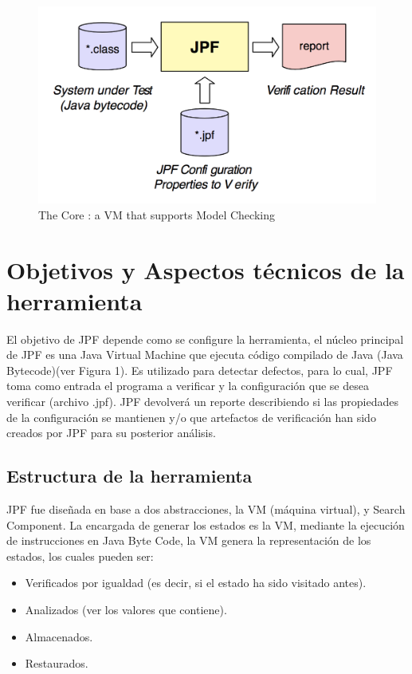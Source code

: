 \documentclass[runningheads]{llncs}
\begin{document}
\begin{figure}
\includegraphics[width=\textwidth]{fig1.png}
\caption{The Core : a VM that supports Model Checking} \label{fig1}
\end{figure}

\section{Objetivos y Aspectos t\'ecnicos de la herramienta}

El objetivo de JPF depende como se configure la herramienta, el n\'ucleo principal de JPF es una Java Virtual Machine que ejecuta c\'odigo compilado de Java (Java Bytecode)(ver Figura 1). Es utilizado para detectar defectos, para lo cual, JPF toma como entrada el programa a verificar y la configuraci\'on que se desea verificar (archivo .jpf). JPF devolver\'a un reporte describiendo si las propiedades de la configuraci\'on se mantienen y/o que artefactos de verificaci\'on han sido creados por JPF para su posterior an\'alisis. 

\subsection{Estructura de la herramienta}

JPF fue dise\~nada en base a dos abstracciones, la VM (m\'aquina virtual), y Search Component.
La encargada de generar los estados es la VM, mediante la ejecuci\'on de instrucciones en Java Byte Code, la VM  genera la representaci\'on de los estados, los cuales pueden ser:

\begin{itemize}
\item Verificados por igualdad (es decir, si el estado ha sido visitado antes).
\item Analizados (ver los valores que contiene).
\item Almacenados.
\item Restaurados.
\end{itemize}
\end{document}
